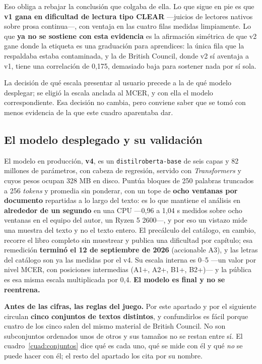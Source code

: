 \documentclass[11pt,a4paper]{article}
\newcommand{\cod}[1]{\texttt{\small #1}}
\begin{document}
Eso obliga a rebajar la conclusión que colgaba de ella. Lo que sigue en pie es que
\textbf{v1 gana en dificultad de lectura tipo CLEAR} —juicios de lectores nativos sobre
prosa continua—, con ventaja en las cuatro filas medidas limpiamente. Lo que \textbf{ya no
se sostiene con esta evidencia} es la afirmación simétrica de que v2 gane donde la
etiqueta es una graduación para aprendices: la única fila que la respaldaba estaba
contaminada, y la de British Council, donde v2 sí aventaja a v1, tiene una correlación de
0,175, demasiado baja para sostener nada por sí sola.

La decisión de qué escala presentar al usuario precede a la de qué modelo desplegar; se
eligió la escala anclada al MCER, y con ella el modelo correspondiente. Esa decisión no
cambia, pero conviene saber que se tomó con menos evidencia de la que este cuadro
aparentaba dar.

\subsection{El modelo desplegado y su validación}
\label{sec:validacion}

El modelo en producción, \textbf{v4}, es un \cod{distilroberta-base}
\parencite{sanh2019distilbert,liu2019roberta} de seis capas y 82 millones de parámetros,
con cabeza de regresión, servido con \emph{Transformers} \parencite{wolf2020transformers}
y cuyos pesos ocupan 328 MB en disco. Puntúa bloques de 250 palabras truncados a 256
\emph{tokens} y promedia sin ponderar, con un tope de \textbf{ocho ventanas por
documento} repartidas a lo largo del texto: es lo que mantiene el análisis en \textbf{alrededor de un segundo}
en una CPU —0,96 a 1,04 s medidos sobre ocho ventanas en el equipo del autor, un
Ryzen 5 2600—, y por eso un vistazo mide una muestra del texto y no el texto
entero. El precálculo del catálogo, en cambio, recorre el libro completo sin
muestrear y publica una dificultad por capítulo; esa remedición \textbf{terminó el 12 de
septiembre de 2026} (accionable A3), y las letras del catálogo son ya las medidas por el
v4. Su escala
interna es 0--5 —un valor por nivel
MCER, con posiciones intermedias (A1+, A2+, B1+, B2+)— y la pública es esa misma escala
multiplicada por 0,4. \textbf{El modelo es final y no se reentrena.}

\textbf{Antes de las cifras, las reglas del juego.} Por este apartado y por el siguiente
circulan \textbf{cinco conjuntos de textos distintos}, y confundirlos es fácil porque
cuatro de los cinco salen del mismo material de British Council. No son subconjuntos
ordenados unos de otros y sus tamaños no se restan entre sí. El
cuadro~\ref{cuad:conjuntos} dice qué es cada uno, qué se mide con él y qué \emph{no} se
puede hacer con él; el resto del apartado los cita por su nombre.
\end{document}
